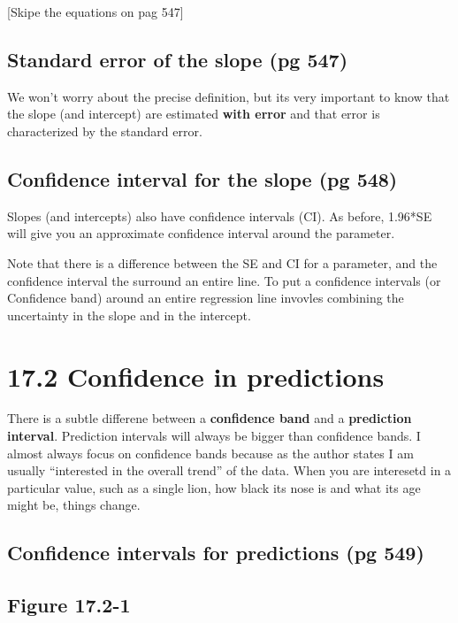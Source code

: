 \documentclass[]{book}
\theoremstyle{definition}
\theoremstyle{definition}
\theoremstyle{definition}
\theoremstyle{remark}
\begin{document}
{[}Skipe the equations on pag 547{]}

\subsection{Standard error of the slope (pg
547)}\label{standard-error-of-the-slope-pg-547}

We won't worry about the precise definition, but its very important to
know that the slope (and intercept) are estimated \textbf{with error}
and that error is characterized by the standard error.

\subsection{Confidence interval for the slope (pg
548)}\label{confidence-interval-for-the-slope-pg-548}

Slopes (and intercepts) also have confidence intervals (CI). As before,
1.96*SE will give you an approximate confidence interval around the
parameter.

Note that there is a difference between the SE and CI for a parameter,
and the confidence interval the surround an entire line. To put a
confidence intervals (or Confidence band) around an entire regression
line invovles combining the uncertainty in the slope and in the
intercept.

\section{17.2 Confidence in
predictions}\label{confidence-in-predictions}

There is a subtle differene between a \textbf{confidence band} and a
\textbf{prediction interval}. Prediction intervals will always be bigger
than confidence bands. I almost always focus on confidence bands because
as the author states I am usually ``interested in the overall trend'' of
the data. When you are interesetd in a particular value, such as a
single lion, how black its nose is and what its age might be, things
change.

\subsection{Confidence intervals for predictions (pg
549)}\label{confidence-intervals-for-predictions-pg-549}

\subsection{Figure 17.2-1}\label{figure-17.2-1}
\end{document}
